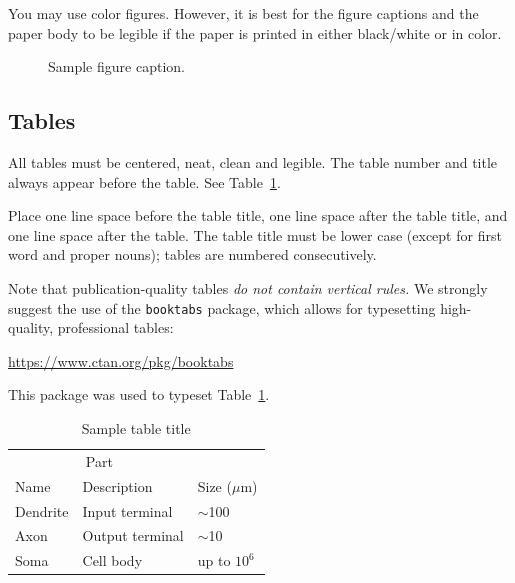 \documentclass{article}
\begin{document}
You may use color figures.  However, it is best for the figure
captions and the paper body to be legible if the paper is printed in
either black/white or in color.
\begin{figure}[h]
  \centering
  \fbox{\rule[-.5cm]{0cm}{4cm} \rule[-.5cm]{4cm}{0cm}}
  \caption{Sample figure caption.}
\end{figure}

\subsection{Tables}

All tables must be centered, neat, clean and legible.  The table
number and title always appear before the table.  See
Table~\ref{sample-table}.

Place one line space before the table title, one line space after the
table title, and one line space after the table. The table title must
be lower case (except for first word and proper nouns); tables are
numbered consecutively.

Note that publication-quality tables \emph{do not contain vertical
  rules.} We strongly suggest the use of the \verb+booktabs+ package,
which allows for typesetting high-quality, professional tables:
\begin{center}
  \url{https://www.ctan.org/pkg/booktabs}
\end{center}
This package was used to typeset Table~\ref{sample-table}.


\begin{table}[t]
  \caption{Sample table title}
  \label{sample-table}
  \centering
  \begin{tabular}{lll}
    \toprule
    \multicolumn{2}{c}{Part}                   \\
    \cmidrule{1-2}
    Name     & Description     & Size ($\mu$m) \\
    \midrule
    Dendrite & Input terminal  & $\sim$100     \\
    Axon     & Output terminal & $\sim$10      \\
    Soma     & Cell body       & up to $10^6$  \\
    \bottomrule
  \end{tabular}
\end{table}
\fi
\end{document}
